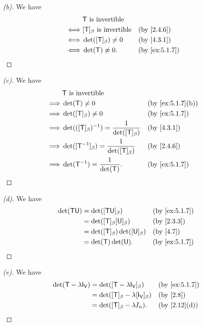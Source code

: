 \begin{proof}[(b)]
  We have
  \begin{align*}
         & \T \text{ is invertible}                              \\
    \iff & [\T]_{\beta} \text{ is invertible} &  & \by{2.4.6}    \\
    \iff & \det([\T]_{\beta}) \neq 0          &  & \by{4.3.1}    \\
    \iff & \det(\T) \neq 0.                   &  & \by{ex:5.1.7}
  \end{align*}
\end{proof}

\begin{proof}[(c)]
  We have
  \begin{align*}
             & \T \text{ is invertible}                                                        \\
    \implies & \det(\T) \neq 0                                           &  & \by{ex:5.1.7}[b] \\
    \implies & \det([\T]_{\beta}) \neq 0                                 &  & \by{ex:5.1.7}    \\
    \implies & \det(([\T]_{\beta})^{-1}) = \dfrac{1}{\det([\T]_{\beta})} &  & \by{4.3.1}       \\
    \implies & \det([\T^{-1}]_{\beta}) = \dfrac{1}{\det([\T]_{\beta})}   &  & \by{2.4.6}       \\
    \implies & \det(\T^{-1}) = \dfrac{1}{\det(\T)}.                      &  & \by{ex:5.1.7}
  \end{align*}
\end{proof}

\begin{proof}[(d)]
  We have
  \begin{align*}
    \det(\T \U) & = \det([\T \U]_{\beta})                 &  & \by{ex:5.1.7} \\
                & = \det([\T]_{\beta} [\U]_{\beta})       &  & \by{2.3.3}    \\
                & = \det([\T]_{\beta}) \det([\U]_{\beta}) &  & \by{4.7}      \\
                & = \det(\T) \det(\U).                    &  & \by{ex:5.1.7}
  \end{align*}
\end{proof}

\begin{proof}[(e)]
  We have
  \begin{align*}
    \det(\T - \lambda \IT[\V]) & = \det([\T - \lambda \IT[\V]]_{\beta})           &  & \by{ex:5.1.7} \\
                               & = \det([\T]_{\beta} - \lambda [\IT[\V]]_{\beta}) &  & \by{2.8}      \\
                               & = \det([\T]_{\beta} - \lambda I_n).              &  & \by{2.12}[d]
  \end{align*}
\end{proof}

